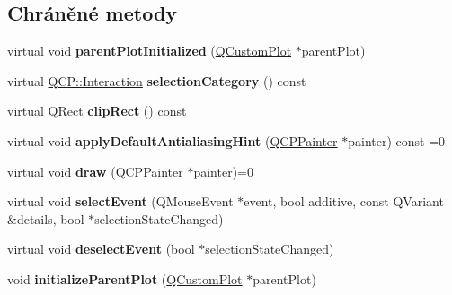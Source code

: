 \subsection*{Chráněné metody}
\begin{DoxyCompactItemize}
\item 
\hypertarget{classQCPLayerable_ab20b7dbd8e0249ed61adb9622c427382}{}virtual void {\bfseries parent\+Plot\+Initialized} (\hyperlink{classQCustomPlot}{Q\+Custom\+Plot} $\ast$parent\+Plot)\label{classQCPLayerable_ab20b7dbd8e0249ed61adb9622c427382}

\item 
\hypertarget{classQCPLayerable_aa4035e586b7f317a06ba7e74e242a5ea}{}virtual \hyperlink{namespaceQCP_a2ad6bb6281c7c2d593d4277b44c2b037}{Q\+C\+P\+::\+Interaction} {\bfseries selection\+Category} () const \label{classQCPLayerable_aa4035e586b7f317a06ba7e74e242a5ea}

\item 
\hypertarget{classQCPLayerable_a07a8f746640c3704b09910df297afcba}{}virtual Q\+Rect {\bfseries clip\+Rect} () const \label{classQCPLayerable_a07a8f746640c3704b09910df297afcba}

\item 
\hypertarget{classQCPLayerable_aa3e319b830b67fcfff62c45348206012}{}virtual void {\bfseries apply\+Default\+Antialiasing\+Hint} (\hyperlink{classQCPPainter}{Q\+C\+P\+Painter} $\ast$painter) const  =0\label{classQCPLayerable_aa3e319b830b67fcfff62c45348206012}

\item 
\hypertarget{classQCPLayerable_aecf2f7087482d4b6a78cb2770e5ed12d}{}virtual void {\bfseries draw} (\hyperlink{classQCPPainter}{Q\+C\+P\+Painter} $\ast$painter)=0\label{classQCPLayerable_aecf2f7087482d4b6a78cb2770e5ed12d}

\item 
\hypertarget{classQCPLayerable_a7498c2d0d081cf7cad0fb3bb93aa0e91}{}virtual void {\bfseries select\+Event} (Q\+Mouse\+Event $\ast$event, bool additive, const Q\+Variant \&details, bool $\ast$selection\+State\+Changed)\label{classQCPLayerable_a7498c2d0d081cf7cad0fb3bb93aa0e91}

\item 
\hypertarget{classQCPLayerable_ae546370644a5551c76af739afc008bee}{}virtual void {\bfseries deselect\+Event} (bool $\ast$selection\+State\+Changed)\label{classQCPLayerable_ae546370644a5551c76af739afc008bee}

\item 
\hypertarget{classQCPLayerable_a8cbe5a0c9a5674249982f5ca5f8e02bc}{}void {\bfseries initialize\+Parent\+Plot} (\hyperlink{classQCustomPlot}{Q\+Custom\+Plot} $\ast$parent\+Plot)\label{classQCPLayerable_a8cbe5a0c9a5674249982f5ca5f8e02bc}


\end{DoxyCompactItemize}
